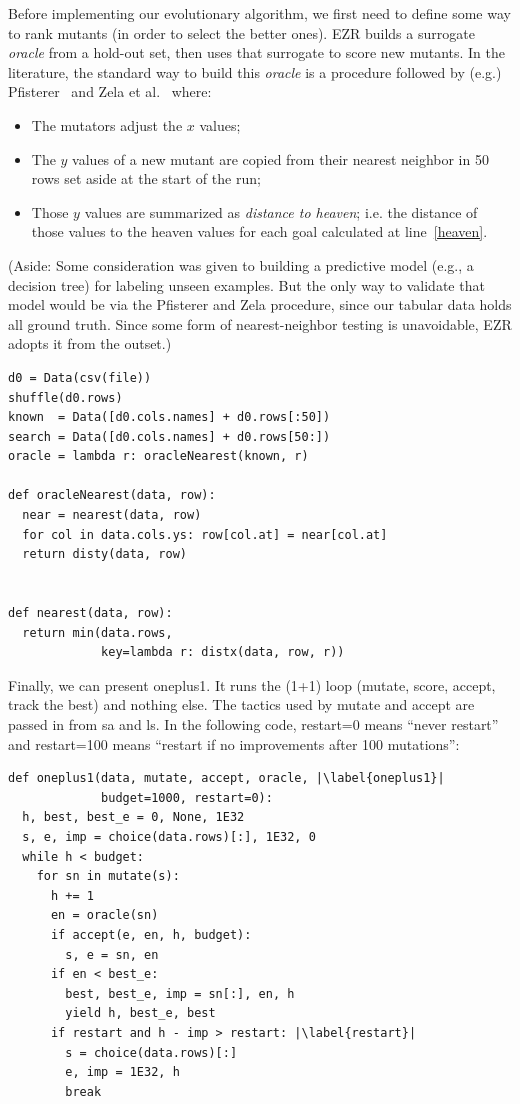 \documentclass[AMA,STIX2COL]{WileyNJDv5}
\begin{document}
Before implementing our evolutionary algorithm, we first need to
define some way to rank mutants (in order to select the better
ones). EZR builds a surrogate {\em oracle} from a hold-out set,
then uses that surrogate to score new mutants. In the literature,
the standard way to build this {\em oracle} is a procedure followed
by (e.g.) Pfisterer~\cite{pfisterer2022yahpo} and Zela et
al.~\cite{zela2020surrogate} where:
\begin{itemize}
\item The mutators adjust the $x$ values;
\item The $y$ values of a new mutant are copied from their nearest
neighbor in 50 rows set aside at the start of the run;
\item Those $y$ values are summarized as {\em distance to heaven};
i.e. the distance of those values to the \textsf{heaven} values
for each goal calculated at line~\ref{heaven}.
\end{itemize}
		(Aside: Some
consideration was given to building a predictive model (e.g., a
decision tree) for labeling   unseen examples. But the
only way to validate that  model would be via the Pfisterer
and Zela procedure, since our tabular data holds all   ground
truth. Since some form of nearest-neighbor testing is unavoidable,
		EZR adopts it from the outset.)
\begin{verbatim}
d0 = Data(csv(file))   
shuffle(d0.rows)
known  = Data([d0.cols.names] + d0.rows[:50])
search = Data([d0.cols.names] + d0.rows[50:])
oracle = lambda r: oracleNearest(known, r)

def oracleNearest(data, row): 
  near = nearest(data, row)
  for col in data.cols.ys: row[col.at] = near[col.at]
  return disty(data, row)
  

def nearest(data, row): 
  return min(data.rows, 
             key=lambda r: distx(data, row, r))
\end{verbatim}
Finally, we can present \textsf{oneplus1}.   It runs the (1+1) loop
(mutate, score, accept, track the best) and nothing else. The
tactics used by \textsf{mutate} and \textsf{accept} are passed in
from \textsf{sa} and \textsf{ls}.
In the following code,
\textsf{restart=0} means ``never restart'' and \textsf{restart=100}
means ``restart if no improvements after 100 mutations'':
\begin{verbatim}
def oneplus1(data, mutate, accept, oracle, |\label{oneplus1}|
             budget=1000, restart=0): 
  h, best, best_e = 0, None, 1E32
  s, e, imp = choice(data.rows)[:], 1E32, 0
  while h < budget:
    for sn in mutate(s):
      h += 1
      en = oracle(sn)
      if accept(e, en, h, budget):
        s, e = sn, en
      if en < best_e:
        best, best_e, imp = sn[:], en, h
        yield h, best_e, best
      if restart and h - imp > restart: |\label{restart}|
        s = choice(data.rows)[:]
        e, imp = 1E32, h
        break
\end{verbatim}
\end{document}
